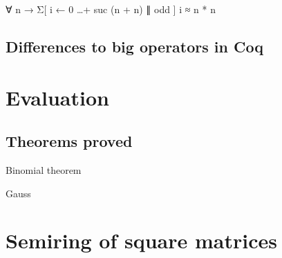 \begin{agdacode}
∀ n → Σ[ i ← 0 …+ suc (n + n) ∥ odd ] i ≈ n * n
\end{agdacode}

\section{Differences to big operators in Coq}

\chapter{Evaluation}

\section{Theorems proved}

Binomial theorem

Gauss

\appendix

\chapter{Semiring of square matrices}



